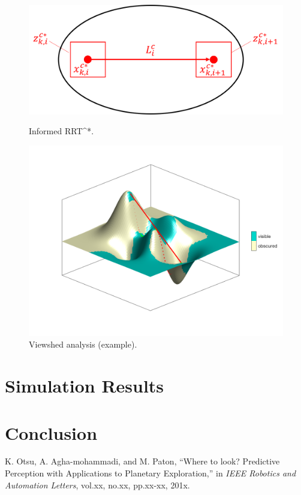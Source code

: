 \documentclass[conference]{IEEEtran}
\begin{document}
\begin{figure}[h]
		\centering
		\includegraphics[width=1.0\columnwidth]{figs/8_11.png}
		\caption{Informed RRT^*.}
		\label{fig:8_11}
		\centering
		\includegraphics[width=1.0\columnwidth]{figs/vs.png}
		\caption{Viewshed analysis (example).}
		\label{fig:vs}
\end{figure}






\section{Simulation Results}

\section{Conclusion}

\begin{thebibliography}{1}

K. Otsu, A. Agha-mohammadi, and M. Paton, ``Where to look? Predictive Perception with Applications to Planetary Exploration,'' in {\it IEEE Robotics and Automation Letters}, vol.xx, no.xx, pp.xx-xx, 201x.

\end{thebibliography}
\end{document}

